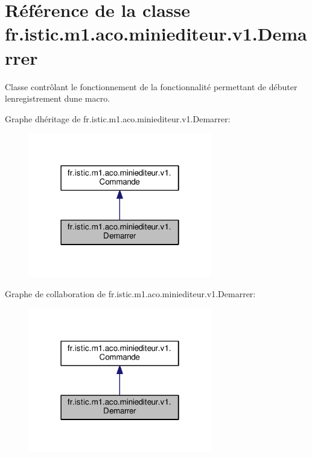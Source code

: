 \hypertarget{classfr_1_1istic_1_1m1_1_1aco_1_1miniediteur_1_1v1_1_1Demarrer}{}\section{Référence de la classe fr.\+istic.\+m1.\+aco.\+miniediteur.\+v1.\+Demarrer}
\label{classfr_1_1istic_1_1m1_1_1aco_1_1miniediteur_1_1v1_1_1Demarrer}


Classe contrôlant le fonctionnement de la fonctionnalité permettant de débuter l\textquotesingle{}enregistrement d\textquotesingle{}une macro.  




Graphe d\textquotesingle{}héritage de fr.\+istic.\+m1.\+aco.\+miniediteur.\+v1.\+Demarrer\+:\nopagebreak
\begin{figure}[H]
\begin{center}
\leavevmode
\includegraphics[width=226pt]{classfr_1_1istic_1_1m1_1_1aco_1_1miniediteur_1_1v1_1_1Demarrer__inherit__graph}
\end{center}
\end{figure}


Graphe de collaboration de fr.\+istic.\+m1.\+aco.\+miniediteur.\+v1.\+Demarrer\+:\nopagebreak
\begin{figure}[H]
\begin{center}
\leavevmode
\includegraphics[width=226pt]{classfr_1_1istic_1_1m1_1_1aco_1_1miniediteur_1_1v1_1_1Demarrer__coll__graph}
\end{center}
\end{figure}
